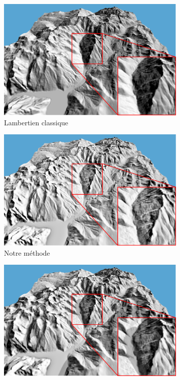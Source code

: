 \begin{figure}[h!]
\centering
 \begin{subfigure}[t]{0.32\linewidth}
 \centering
 \includegraphics[width=1.0\linewidth]{Resultats/lambertien.png}
 \caption{Lambertien classique }
 \end{subfigure}
 \begin{subfigure}[t]{0.32\linewidth}
 \centering
 \includegraphics[width=1.0\linewidth]{Resultats/ombrage.png}
  \caption{Notre méthode}
 \end{subfigure}
  \begin{subfigure}[t]{0.32\linewidth}
 \centering
 \includegraphics[width=1.0\linewidth]{Resultats/ombre_portee.png}

\end{subfigure}
\end{figure}
